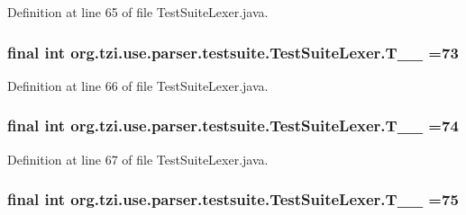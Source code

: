 Definition at line 65 of file Test\-Suite\-Lexer.\-java.

\hypertarget{classorg_1_1tzi_1_1use_1_1parser_1_1testsuite_1_1_test_suite_lexer_a790114a8ea8b7e46c7c37763edeed876}{
\subsubsection[{T\-\_\-\-\_\-73}]{\setlength{\rightskip}{0pt plus 5cm}final int org.\-tzi.\-use.\-parser.\-testsuite.\-Test\-Suite\-Lexer.\-T\-\_\-\-\_ =73\hspace{0.3cm}{\ttfamily [static]}}}\label{classorg_1_1tzi_1_1use_1_1parser_1_1testsuite_1_1_test_suite_lexer_a790114a8ea8b7e46c7c37763edeed876}


Definition at line 66 of file Test\-Suite\-Lexer.\-java.

\hypertarget{classorg_1_1tzi_1_1use_1_1parser_1_1testsuite_1_1_test_suite_lexer_a2cfc49ed871de4806171d672f1c3339b}{
\subsubsection[{T\-\_\-\-\_\-74}]{\setlength{\rightskip}{0pt plus 5cm}final int org.\-tzi.\-use.\-parser.\-testsuite.\-Test\-Suite\-Lexer.\-T\-\_\-\-\_ =74\hspace{0.3cm}{\ttfamily [static]}}}\label{classorg_1_1tzi_1_1use_1_1parser_1_1testsuite_1_1_test_suite_lexer_a2cfc49ed871de4806171d672f1c3339b}


Definition at line 67 of file Test\-Suite\-Lexer.\-java.

\hypertarget{classorg_1_1tzi_1_1use_1_1parser_1_1testsuite_1_1_test_suite_lexer_aad5120bb4ae75486b0ad34e688683d1d}{
\subsubsection[{T\-\_\-\-\_\-75}]{\setlength{\rightskip}{0pt plus 5cm}final int org.\-tzi.\-use.\-parser.\-testsuite.\-Test\-Suite\-Lexer.\-T\-\_\-\-\_ =75\hspace{0.3cm}{\ttfamily [static]}}}\label{classorg_1_1tzi_1_1use_1_1parser_1_1testsuite_1_1_test_suite_lexer_aad5120bb4ae75486b0ad34e688683d1d}


